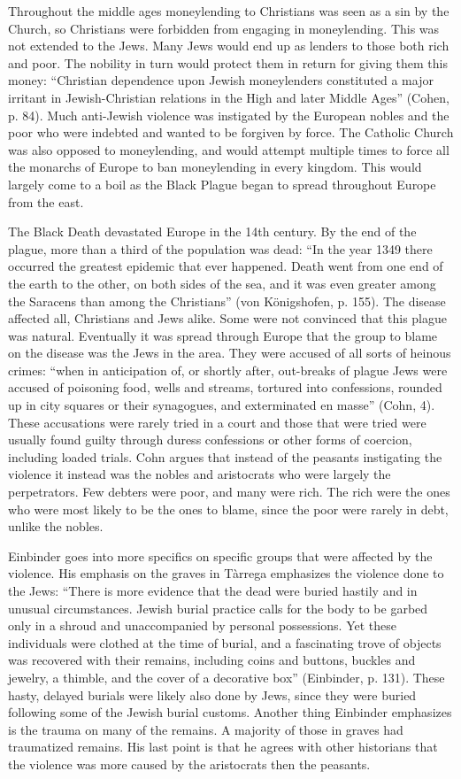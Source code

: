 \documentclass[12pt]{article}
\begin{document}
Throughout the middle ages moneylending to Christians was seen as a sin by the Church, so Christians were forbidden from engaging in moneylending.
This was not extended to the Jews.
Many Jews would end up as lenders to those both rich and poor.
The nobility in turn would protect them in return for giving them this money:
``Christian dependence upon Jewish moneylenders constituted a major irritant in Jewish-Christian relations in the High and later Middle Ages'' (Cohen, p. 84).
Much anti-Jewish violence was instigated by the European nobles and the poor who were indebted and wanted to be forgiven by force.
The Catholic Church was also opposed to moneylending, and would attempt multiple times to force all the monarchs of Europe to ban moneylending in every kingdom.
This would largely come to a boil as the Black Plague began to spread throughout Europe from the east.

The Black Death devastated Europe in the 14th century. By the end of the plague, more than a third of the population was dead:
``In the year 1349 there occurred the greatest epidemic that ever happened. 
Death went from one end of the earth to the other, on both sides of the sea, 
and it was even greater among the Saracens than among the Christians'' (von 
Königshofen, p. 155).
The disease affected all, Christians and Jews alike.
Some were not convinced that this plague was natural.
Eventually it was spread through Europe that the group to blame on the disease was the Jews in the area.
They were accused of all sorts of heinous crimes:
``when in anticipation of, or shortly after, out-breaks of plague Jews were accused of poisoning food, wells and streams, tortured into confessions, rounded up in city squares or their synagogues, and exterminated en masse'' (Cohn, 4).
These accusations were rarely tried in a court and those that were tried were usually found guilty through duress confessions or other forms of coercion, including loaded trials.
Cohn argues that instead of the peasants instigating the violence it instead was the nobles and aristocrats who were largely the perpetrators.
Few debters were poor, and many were rich.
The rich were the ones who were most likely to be the ones to blame, since the poor were rarely in debt, unlike the nobles.

Einbinder goes into more specifics on specific groups that were affected by the violence.
His emphasis on the graves in Tàrrega emphasizes the violence done to the Jews: 
``There is more evidence that the dead were buried hastily and in unusual circumstances. Jewish burial practice calls for the body to be garbed only in a shroud and unaccompanied by personal possessions. Yet these individuals were clothed at the time of burial, and a fascinating trove of objects was recovered with their remains, including coins and buttons, buckles and jewelry, a thimble, and the cover of a decorative box'' (Einbinder, p. 131).
These hasty, delayed burials were likely also done by Jews, since they were buried following some of the Jewish burial customs.
Another thing Einbinder emphasizes is the trauma on many of the remains.
A majority of those in graves had traumatized remains.
His last point is that he agrees with other historians that the violence was more caused by the aristocrats then the peasants.
\end{document}
